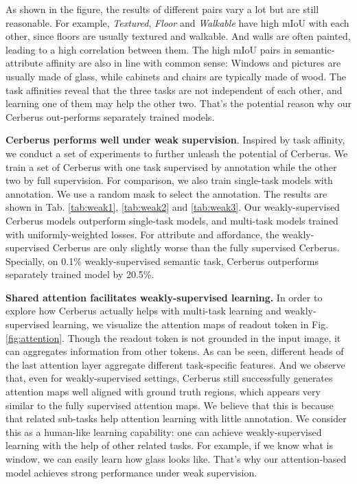 \documentclass[10pt,twocolumn,letterpaper]{article}
\begin{document}
As shown in the figure, the results of different pairs vary a lot but are still reasonable. For example, \emph{Textured}, \emph{Floor} and \emph{Walkable} have high mIoU with each other, since floors are usually textured and walkable. And walls are often painted, leading to a high correlation between them. The high mIoU pairs in semantic-attribute affinity are also in line with common sense: Windows and pictures are usually made of glass, while cabinets and chairs are typically made of wood. The task affinities reveal that the three tasks are not independent of each other, and learning one of them may help the other two. That's the potential reason why our Cerberus out-performs separately trained models. 




\textbf{Cerberus performs well under weak supervision}. Inspired by task affinity, we conduct a set of experiments to further unleash the potential of Cerberus. We train a set of Cerberus with one task supervised by  annotation while the other two by full supervision. For comparison, we also train single-task models with  annotation. We use a random mask to select the annotation. The results are shown in Tab. \ref{tab:weak1}, \ref{tab:weak2} and \ref{tab:weak3}. Our weakly-supervised Cerberus models outperform single-task models, and multi-task models trained with uniformly-weighted losses. For attribute and affordance, the weakly-supervised Cerberus are only slightly worse than the fully supervised Cerberus. Specially,  on 0.1\% weakly-supervised semantic task, Cerberus outperforms separately trained model by 20.5\%. 

\textbf{Shared attention facilitates weakly-supervised learning.} In order to explore how Cerberus actually helps with multi-task learning and weakly-supervised learning, we visualize the attention maps of readout token in Fig.\ref{fig:attention}. Though the readout token is not grounded in the input image, it can aggregates information from other tokens. As can be seen, different heads of the last attention layer aggregate different task-specific features. And we observe that, even for weakly-supervised settings, Cerberus still successfully generates attention maps well aligned with ground truth regions, which appears very similar to the fully supervised attention maps. We believe that this is because that related sub-tasks help attention learning with little annotation. We consider this as a human-like learning capability: one can achieve weakly-supervised learning with the help of other related tasks. For example, if we know what is window, we can easily learn how glass looks like. That's why our attention-based model achieves strong performance under weak supervision.
\end{document}
